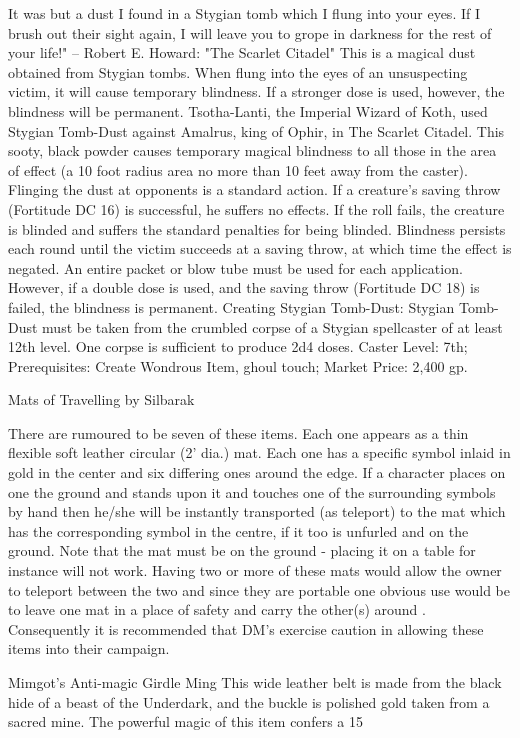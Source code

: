 It was but a dust I found in a Stygian tomb which I flung into your eyes. If I brush out their sight again, I will leave you to grope in darkness for the rest of your life!" -- Robert E. Howard: "The Scarlet Citadel"
This is a magical dust obtained from Stygian tombs. When flung into the eyes of an unsuspecting victim, it will cause temporary blindness. If a stronger dose is used, however, the blindness will be permanent.
Tsotha-Lanti, the Imperial Wizard of Koth, used Stygian Tomb-Dust against Amalrus, king of Ophir, in The Scarlet Citadel.
This sooty, black powder causes temporary magical blindness to all those in the area of effect (a 10 foot radius area no more than 10 feet away from the caster). Flinging the dust at opponents is a standard action.
If a creature's saving throw (Fortitude DC 16) is successful, he suffers no effects. If the roll fails, the creature is blinded and suffers the standard penalties for being blinded. Blindness persists each round until the victim succeeds at a saving throw, at which time the effect is negated.
An entire packet or blow tube must be used for each application. However, if a double dose is used, and the saving throw (Fortitude DC 18) is failed, the blindness is permanent.
Creating Stygian Tomb-Dust: Stygian Tomb-Dust must be taken from the crumbled corpse of a Stygian spellcaster of at least 12th level. One corpse is sufficient to produce 2d4 doses.
Caster Level: 7th; Prerequisites: Create Wondrous Item, ghoul touch; Market Price: 2,400 gp.



Mats of Travelling by Silbarak

There are rumoured to be seven of these items. Each one appears as a thin flexible soft leather circular (2' dia.) mat.
Each one has a specific symbol inlaid in gold in the center and six differing ones around the edge. If a character places on one the ground and stands upon it and touches one of the surrounding symbols by hand then he/she will be instantly transported (as teleport) to the mat which has the corresponding symbol in the centre, if it too is unfurled and on the ground.
Note that the mat must be on the ground - placing it on a table for instance will not work. Having two or more of these mats would allow the owner to teleport between the two and since they are portable one obvious use would be to leave one mat in a place of safety and carry the other(s) around . Consequently it is recommended that DM's exercise caution in allowing these items into their campaign.


Mimgot’s Anti-magic Girdle
Ming
This wide leather belt is made from the black hide of a beast of the Underdark, and the buckle is polished gold taken from a sacred mine. The powerful magic of this item confers a 15%

